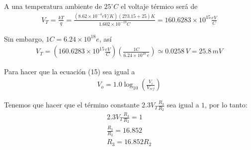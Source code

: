 \documentclass{article}
\begin{document}
\noindent A una temperatura ambiente de $25^{\circ}C$ el voltaje térmico será de
\begin{align}
	V_T = \frac{kT}{q} = \frac{(8.62 \times 10^{-4} eV/K)(273.15 + 25)K}{1.602 \times 10^{-19} C} = 160.6283 \times 10^{15} \frac{eV}{C}
\end{align}

\noindent Sin embargo, $1C = 6.24\times 10^{18}e$, así
\begin{align}
	V_T = \left( 160.6283 \times 10^{15} \frac{eV}{C} \right) \left( \frac{1C}{6.24 \times 10^{18}\,e} \right) \simeq 0.0258 \, V = 25.8 \,mV\nonumber
\end{align}

\noindent Para hacer que la ecuación (15) sea igual a
\begin{align}
	V_o = 1.0 \log_{10} \left( \frac{V_i}{V_{ref}} \right)\nonumber
\end{align}

\noindent Tenemos que hacer que el término constante $2.3V_T \frac{R_3}{R_2}$ sea igual a $1$, por lo tanto:
\begin{align}
	2.3V_T \frac{R_3}{R_2} = 1\nonumber\\
	\frac{R_3}{R_2} = 16.852\nonumber\\
	R_3 = 16.852R_2
\end{align}
\end{document}
